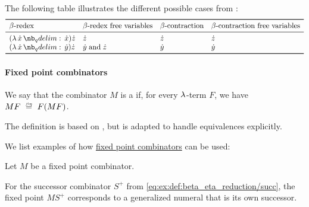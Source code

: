 \begin{example}\label{ex:thm:lambda_reduction_free_variables}
  The following table illustrates the different possible cases from :
  \begin{equation*}
    \begin{array}{*{4}{l}}
      \toprule
      \T{\( \beta \)-redex}     & \T{\( \beta \)-redex free variables} & \T{\( \beta \)-contraction} & \T{\( \beta \)-contraction free variables} \\
      \midrule
      (\qabs \synx \synx) \synz & \synz                                & \synz                       & \synz                                      \\
      (\qabs \synx \syny) \synz & \syny \T{and} \synz                  & \syny                       & \syny                                      \\
      \bottomrule
    \end{array}
  \end{equation*}
\end{example}

\paragraph{Fixed point combinators}

\begin{definition}\label{def:fixed_point_combinator}\mimprovised
  We say that the combinator \( M \) is a  if, for every \( \mathrm{\lambda} \)-term \( F \), we have \( MF \beequiv F(MF) \).
\end{definition}
\begin{comments}
  \item The definition is based on \cite[\S 6.1.2]{Barendregt1984LambdaCalculus}, but is adapted to handle equivalences explicitly.
\end{comments}

\begin{example}\label{ex:def:fixed_point_combinator}
  We list examples of how \hyperref[def:fixed_point_combinator]{fixed point combinators} can be used:
  \begin{thmenum}
     Let \( M \) be a fixed point combinator.

    For the successor combinator \( S^+ \) from \eqref{eq:ex:def:beta_eta_reduction/succ}, the fixed point \( MS^+ \) corresponds to a generalized numeral that is its own successor.
  \end{thmenum}
\end{example}

